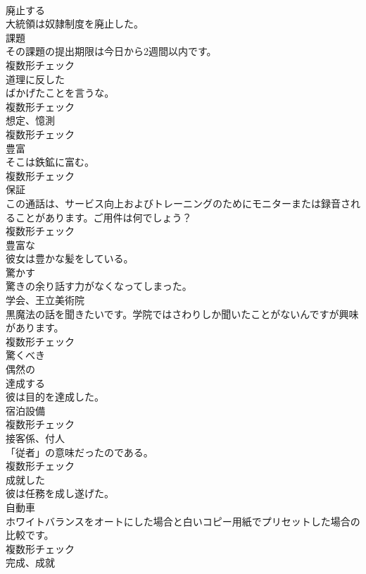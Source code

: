 \documentclass[8pt]{extreport}
\begin{document}
\begin{CJK}{UTF8}{min}
\\	[動詞]	廃止する	
\\	大統領は奴隷制度を廃止した。	
\\	[名詞]	課題	
\\	その課題の提出期限は今日から2週間以内です。	
\\	複数形チェック
\\	[名詞]	道理に反した	
\\	ばかげたことを言うな。	
\\	複数形チェック
\\	[名詞]	想定、憶測	
\\	複数形チェック
\\	[名詞]	豊富	
\\	そこは鉄鉱に富む。	
\\	複数形チェック
\\	[名詞]	保証	
\\	この通話は、サービス向上およびトレーニングのためにモニターまたは録音されることがあります。ご用件は何でしょう？	
\\	複数形チェック
\\	[形容詞]	豊富な	
\\	彼女は豊かな髪をしている。	
\\	[動詞]	驚かす	
\\	驚きの余り話す力がなくなってしまった。	
\\	[名詞]	学会、王立美術院	
\\	黒魔法の話を聞きたいです。学院ではさわりしか聞いたことがないんですが興味があります。	
\\	複数形チェック
\\	[形容詞]	驚くべき	
\\	[形容詞]	偶然の	
\\	[動詞]	達成する	
\\	彼は目的を達成した。	
\\	[名詞]	宿泊設備	
\\	複数形チェック
\\	[名詞]	接客係、付人	
\\	「従者」の意味だったのである。	
\\	複数形チェック
\\	[形容詞]	成就した	
\\	彼は任務を成し遂げた。	
\\	[名詞]	自動車	
\\	ホワイトバランスをオートにした場合と白いコピー用紙でプリセットした場合の比較です。	
\\	複数形チェック
\\	[名詞]	完成、成就	

\end{CJK}
\end{document}
